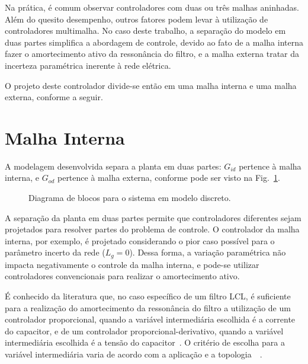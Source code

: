   Na prática, é comum observar controladores com duas ou três malhas aninhadas. Além do quesito desempenho, outros fatores podem levar à utilização de controladores multimalha. No caso deste trabalho, a separação do modelo em duas partes simplifica a abordagem de controle, devido ao fato de a malha interna fazer o amortecimento ativo da ressonância do filtro, e a malha externa tratar da incerteza paramétrica inerente à rede elétrica.

  O projeto deste controlador divide-se então em uma malha interna e uma malha externa, conforme a seguir.

\section{Malha Interna}

  A modelagem desenvolvida separa a planta em duas partes: $G_{id}$ pertence à malha interna, e $G_{od}$ pertence à malha externa, conforme pode ser visto na Fig.~\ref{fig:sistema_discreto}.

  \begin{figure}[htb]
    \centering{
      \def\svgwidth{\textwidth}
      }
    \renewcommand\figurename{Fig.}
    \caption{Diagrama de blocos para o sistema em modelo discreto.}
    \label{fig:sistema_discreto}
  \end{figure}

  A separação da planta em duas partes permite que controladores diferentes sejam projetados para resolver partes do problema de controle. O controlador da malha interna, por exemplo, é projetado considerando o pior caso possível para o parâmetro incerto da rede ($L_g=0$). Dessa forma, a variação paramétrica não impacta negativamente o controle da malha interna, e pode-se utilizar controladores convencionais para realizar o amortecimento ativo.

  É conhecido da literatura que, no caso específico de um filtro LCL, é suficiente para a realização do amortecimento da ressonância do filtro a utilização de um controlador proporcional, quando a variável intermediária escolhida é a corrente do capacitor, e de um controlador proporcional-derivativo, quando a variável intermediária escolhida é a tensão do capacitor~\cite{ref:DANNEHL}. O critério de escolha para a variável intermediária varia de acordo com a aplicação e a topologia~\cite{ref:POH}~\cite{ref:IECON_2013}.

